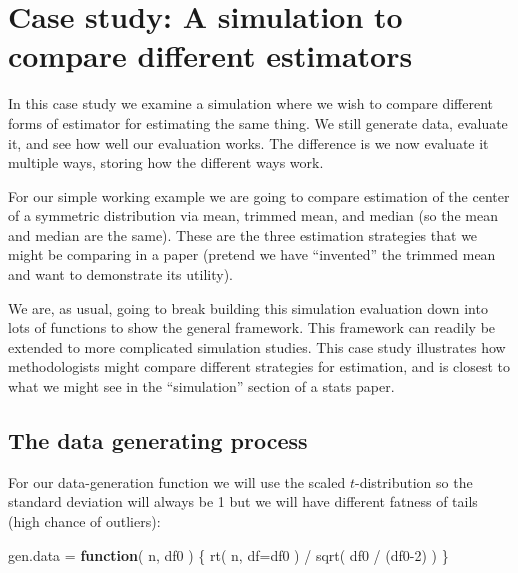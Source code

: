\documentclass[
]{book}
\newenvironment{Shaded}{\begin{snugshade}}{\end{snugshade}}
\newcommand{\AttributeTok}[1]{\textcolor[rgb]{0.77,0.63,0.00}{#1}}
\newcommand{\ControlFlowTok}[1]{\textcolor[rgb]{0.13,0.29,0.53}{\textbf{#1}}}
\newcommand{\DecValTok}[1]{\textcolor[rgb]{0.00,0.00,0.81}{#1}}
\newcommand{\FunctionTok}[1]{\textcolor[rgb]{0.00,0.00,0.00}{#1}}
\newcommand{\NormalTok}[1]{#1}
\newcommand{\OtherTok}[1]{\textcolor[rgb]{0.56,0.35,0.01}{#1}}
\newcommand{\SpecialCharTok}[1]{\textcolor[rgb]{0.00,0.00,0.00}{#1}}
\begin{document}
\hypertarget{case-study-a-simulation-to-compare-different-estimators}{%
\chapter{Case study: A simulation to compare different estimators}\label{case-study-a-simulation-to-compare-different-estimators}}

In this case study we examine a simulation where we wish to compare different forms of
estimator for estimating the same thing. We still generate data, evaluate it,
and see how well our evaluation works. The difference is we now evaluate it
multiple ways, storing how the different ways work.

For our simple working example we are going to compare estimation of the
center of a symmetric distribution via mean, trimmed mean, and median (so the
mean and median are the same). These are the three estimation strategies
that we might be comparing in a paper (pretend we have ``invented'' the trimmed
mean and want to demonstrate its utility).

We are, as usual, going to break building this simulation evaluation down into lots of
functions to show the general framework. This framework can readily be
extended to more complicated simulation studies.
This case study illustrates how methodologists might compare different strategies for estimation, and is
closest to what we might see in the ``simulation'' section of a stats paper.

\hypertarget{the-data-generating-process}{%
\section{The data generating process}\label{the-data-generating-process}}

For our data-generation function we will use the scaled \(t\)-distribution so
the standard deviation will always be 1 but we will have different fatness of
tails (high chance of outliers):

\begin{Shaded}
\begin{Highlighting}[]
\NormalTok{gen.data }\OtherTok{=} \ControlFlowTok{function}\NormalTok{( n, df0 ) \{}
    \FunctionTok{rt}\NormalTok{( n, }\AttributeTok{df=}\NormalTok{df0 ) }\SpecialCharTok{/} \FunctionTok{sqrt}\NormalTok{( df0 }\SpecialCharTok{/}\NormalTok{ (df0}\DecValTok{{-}2}\NormalTok{) )}
\NormalTok{\}}
\end{Highlighting}
\end{Shaded}
\end{document}
